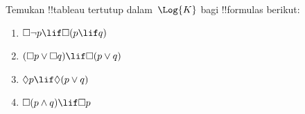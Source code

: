 \documentclass[../../../include/open-logic-section]{subfiles}
\begin{document}
\begin{prob}
  Temukan !!{tableau} tertutup dalam~$\Log{K}$ bagi !!{formula}s berikut:
  \begin{enumerate}
    \item $\Box \lnot p \lif \Box(p \lif q)$
    \item $(\Box p \lor \Box q) \lif \Box(p \lor q)$
    \item $\Diamond p \lif \Diamond(p \lor q)$
    \item $\Box(p \land q) \lif \Box p$
  \end{enumerate}
\end{prob}
\end{document}
